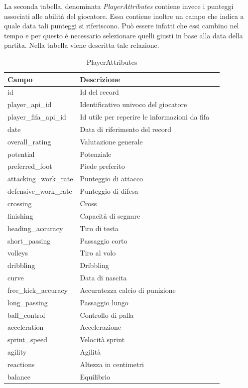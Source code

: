 \documentclass[hidelinks, 12pt]{article}
\begin{document}
	La seconda tabella, denominata {\it PlayerAttributes} contiene invece i punteggi associati alle abilità del giocatore. Essa contiene inoltre un campo che indica a quale data tali punteggi si riferiscono. Può essere infatti che essi cambino nel tempo e per questo è necessario selezionare quelli giusti in base alla data della partita. Nella tabella \cite{tab:player_attr} viene descritta tale relazione.
	
	\begin{table}[H]
		\caption{PlayerAttributes}\label{tab:player_attr}
		\begin{tabular}{|l|l|l|}
			\hline
			Campo & Descrizione \\
			\hline
			id & Id del record \\
			player\_api\_id & Identificativo univoco del giocatore \\
			player\_fifa\_api\_id & Id utile per reperire le informazioni da fifa \\
			date & Data di riferimento del record \\
			overall\_rating & Valutazione generale \\
			potential & Potenziale \\
			preferred\_foot & Piede preferito \\
			attacking\_work\_rate & Punteggio di attacco \\
			defensive\_work\_rate & Punteggio di difesa \\
			crossing & Cross \\
			finishing & Capacità di segnare \\
			heading\_accuracy & Tiro di testa \\
			short\_passing & Passaggio corto \\
			volleys & Tiro al volo \\
			dribbling & Dribbling \\
			curve & Data di nascita \\
			free\_kick\_accuracy & Accuratezza calcio di punizione \\
			long\_passing & Passaggio lungo \\
			ball\_control & Controllo di palla \\
			acceleration & Accelerazione \\
			sprint\_speed & Velocità sprint \\
			agility & Agilità \\
			reactions & Altezza in centimetri \\
			balance & Equilibrio \\

\end{tabular}
\end{table}
\end{document}
